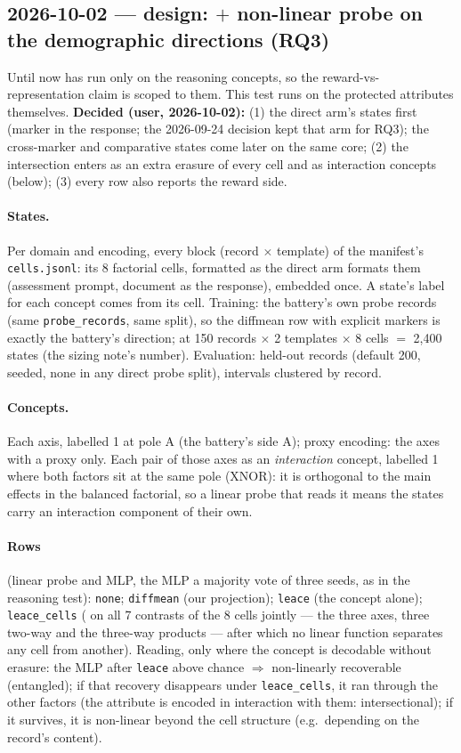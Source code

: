 \documentclass{article}
\begin{document}
\subsection*{2026-10-02 --- design: \leace{} $+$ non-linear probe on the demographic directions (RQ3)}
Until now \leace{} has run only on the reasoning concepts, so the reward-vs-representation claim is scoped to them.
This test runs on the protected attributes themselves. \textbf{Decided (user, 2026-10-02):} (1) the direct arm's
states first (marker in the response; the 2026-09-24 decision kept that arm for RQ3); the cross-marker and
comparative states come later on the same core; (2) the intersection enters as an extra erasure of every cell and as
interaction concepts (below); (3) every row also reports the reward side.

\paragraph{States.} Per domain and encoding, every block (record $\times$ template) of the manifest's
\texttt{cells.jsonl}: its 8 factorial cells, formatted as the direct arm formats them (assessment prompt, document as
the response), embedded once. A state's label for each concept comes from its cell. Training: the battery's own
probe records (same \texttt{probe\_records}, same split), so the diffmean row with explicit markers is exactly the
battery's direction; at 150 records $\times$ 2 templates $\times$ 8 cells $=$ 2{,}400 states (the sizing note's
number). Evaluation: held-out records (default 200, seeded, none in any direct probe split), intervals clustered by
record.

\paragraph{Concepts.} Each axis, labelled 1 at pole A (the battery's side A); proxy encoding: the axes with a proxy
only. Each pair of those axes as an \emph{interaction} concept, labelled 1 where both factors sit at the same pole
(XNOR): it is orthogonal to the main effects in the balanced factorial, so a linear probe that reads it means the
states carry an interaction component of their own.

\paragraph{Rows} (linear probe and MLP, the MLP a majority vote of three seeds, as in the reasoning test):
\texttt{none}; \texttt{diffmean} (our projection); \texttt{leace} (the concept alone); \texttt{leace\_cells}
(\leace{} on all 7 contrasts of the 8 cells jointly --- the three axes, three two-way and the three-way products ---
after which no linear function separates any cell from another). Reading, only where the concept is decodable
without erasure: the MLP after \texttt{leace} above chance $\Rightarrow$ non-linearly recoverable (entangled); if that
recovery disappears under \texttt{leace\_cells}, it ran through the other factors (the attribute is encoded in
interaction with them: intersectional); if it survives, it is non-linear beyond the cell structure (e.g.\ depending on
the record's content).
\end{document}
